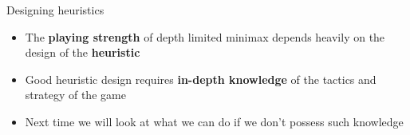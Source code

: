 \begin{frame}{Designing heuristics}
	\begin{itemize}
		\pause\item The \textbf{playing strength} of depth limited minimax depends heavily on the design of the \textbf{heuristic}
		\pause\item Good heuristic design requires \textbf{in-depth knowledge} of the tactics and strategy of the game
		\pause\item Next time we will look at what we can do if we don't possess such knowledge
	\end{itemize}
\end{frame}

